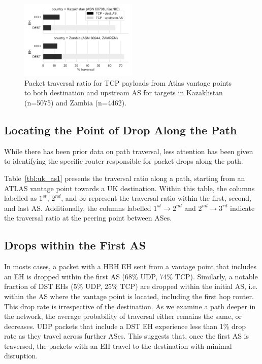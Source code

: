 \documentclass[conference]{IEEEtran}
\begin{document}

\begin{figure}
\centering
  \includegraphics[width=0.5\textwidth]{traversal-pathologies.png}
  \caption{Packet traversal ratio for TCP payloads from Atlas vantage points to both destination and upstream
AS for targets in Kazakhstan (n=5075) and Zambia (n=4462).}
  \label{fig:traversal_pathologies}
\end{figure}

\subsection{Locating the Point of Drop Along the Path}

While there has been prior data on path traversal, less attention has been
given to identifying the specific router responsible for packet drops along the
path.

Table~\ref{tbl:uk_as1} presents the traversal ratio along a
path, starting from an ATLAS vantage point towards a UK destination.
Within this table, the columns labelled as $1^{st}$, $2^{nd}$, and $\infty$
represent the traversal ratio within the first, second, and last AS.
Additionally, the columns labelled $1^{st}\rightarrow 2^{nd}$ and
$2^{nd}\rightarrow 3^{rd}$ indicate the traversal ratio at the peering point
between ASes.

\subsection{Drops within the First AS}

In mosts cases, a packet with a HBH EH sent from a vantage point that
includes an EH is dropped within the first AS  (68\% UDP, 74\% TCP).
Similarly, a notable fraction of DST EHs (5\% UDP, 25\% TCP) are dropped within the
initial AS, i.e.  within the AS where the vantage point is located, including
the first hop router. This drop rate is irrespective of the destination.
As we examine a path deeper in the network, the average probability of traversal
either remains the same, or decreases. 
UDP packets that include a DST EH
experience less than 1\% drop rate as they travel across further ASes.  This
suggests that, once the first AS is traversed, the packets with an EH travel to the
destination with minimal disruption.
\end{document}
